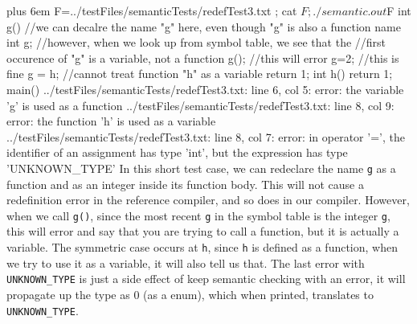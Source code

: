\documentclass{article}
\makeatletter
\newenvironment{myverb}
 {\def\@xobeysp{\ }\verbatim\rightskip=0pt plus 6em\relax}
 {\endverbatim}
\makeatother
\begin{document}
\begin{itemize}
\begin{myverb}
F=../testFiles/semanticTests/redefTest3.txt ; cat $F; ./semantic.out $F
int g(){
    //we can decalre the name "g" here, even though "g" is also a function name
    int g;
    //however, when we look up from symbol table, we see that the
    //first occurence of "g" is a variable, not a function
    g(); //this will error
    g=2; //this is fine
    g = h; //cannot treat function "h" as a variable
    return 1;
}
int h() {return 1;}
main(){}
../testFiles/semanticTests/redefTest3.txt: line 6, col 5: error: the variable 'g' is used as a function
../testFiles/semanticTests/redefTest3.txt: line 8, col 9: error: the function 'h' is used as a variable
../testFiles/semanticTests/redefTest3.txt: line 8, col 7: error: in operator '=', the identifier of an assignment has type 'int', but the expression has type 'UNKNOWN_TYPE'
\end{myverb}
In this short  test case, we can redeclare the name \verb|g| as a function and as an integer inside its function body. This will not cause a redefinition error in the reference compiler, and so does in our compiler. However, when we call \verb|g()|, since the most recent \verb|g| in the symbol table is the integer \verb|g|, this will error and say that you are trying to call a function, but it is actually a variable.
The symmetric case occurs at \verb|h|, since \verb|h| is defined as a function, when we try to use it as a variable, it will also tell us that. The last error with \verb|UNKNOWN_TYPE| is just a side effect of keep semantic checking with an error, it will propagate up the type as $0$ (as a enum), which when printed, translates to \verb|UNKNOWN_TYPE|.


\end{itemize}
\end{document}
